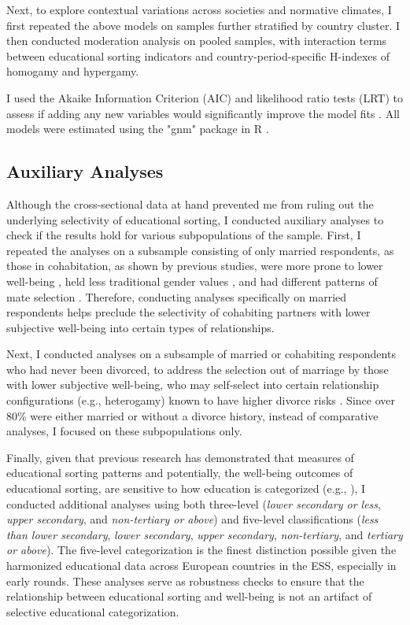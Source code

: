 Next, to explore contextual variations across societies and normative climates, I first repeated the above models on samples further stratified by country cluster. I then conducted moderation analysis on pooled samples, with interaction terms between educational sorting indicators and country-period-specific H-indexes of homogamy and hypergamy.

I used the Akaike Information Criterion (AIC) and likelihood ratio tests (LRT) to assess if adding any new variables would significantly improve the model fits \parencite{sobelSocialMobilityFertility1985}. All models were estimated using the "gnm" package in R \parencite{turnerGnmGeneralizedNonlinear2005}.

\subsection{Auxiliary Analyses}

Although the cross-sectional data at hand prevented me from ruling out the underlying selectivity of educational sorting, I conducted auxiliary analyses to check if the results hold for various subpopulations of the sample. First, I repeated the analyses on a subsample consisting of only married respondents, as those in cohabitation, as shown by previous studies, were more prone to lower well-being \parencite{soonsMarriageMoreCohabitation2009}, held less traditional gender values \parencite{dominguez-folguerasCohabitationMoreEgalitarian2013}, and had different patterns of mate selection \parencite{esteveEducationalHomogamyGap2013}. Therefore, conducting analyses specifically on married respondents helps preclude the selectivity of cohabiting partners with lower subjective well-being into certain types of relationships.

Next, I conducted analyses on a subsample of married or cohabiting respondents who had never been divorced, to address the selection out of marriage by those with lower subjective well-being, who may self-select into certain relationship configurations (e.g., heterogamy) known to have higher divorce risks \parencite{kalmijnUnionDisruptionNetherlands2003,kalmijnCountryDifferencesEffects2010,theunisHisHerEducation2018}. Since over 80\% were either married or without a divorce history, instead of comparative analyses, I focused on these subpopulations only.

Finally, given that previous research has demonstrated that measures of educational sorting patterns and potentially, the well-being outcomes of educational sorting, are sensitive to how education is categorized (e.g., \cite{gihlebEducationalHomogamyAssortative2020}), I conducted additional analyses using both three-level (\textit{lower secondary or less}, \textit{upper secondary}, and \textit{non-tertiary or above}) and five-level classifications (\textit{less than lower secondary}, \textit{lower secondary}, \textit{upper secondary}, \textit{non-tertiary}, and \textit{tertiary or above}). The five-level categorization is the finest distinction possible given the harmonized educational data across European countries in the ESS, especially in early rounds. These analyses serve as robustness checks to ensure that the relationship between educational sorting and well-being is not an artifact of selective educational categorization.
